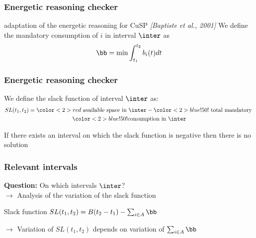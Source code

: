 \begin{frame}
  \frametitle{Energetic reasoning checker}
  {\small adaptation of the energetic reasoning for CuSP {\color{gray!50!black!50} \it [Baptiste et al., 2001]}}
  \vfill
  We define the mandatory consumption of $i$ in interval $\inter$ as 
  \[\bb=\min \int_{t_1}^{t_2} b_i(t) dt\]
  \vfill
  
\end{frame}



\begin{frame}
  \frametitle{Energetic reasoning checker}
  We define the  slack function of interval $\inter$ as:
  \begin{gather}
    SL(t_1,t_2)={\color<2>{red}\text{ available space in
      }\inter}-{\color<2>{blue!50!}\text{ total mandatory }} \nonumber\\ 
        {\color<2>{blue!50!}\text{consumption in } \inter}\nonumber
  \end{gather}
  \begin{theorem}
    If there exists an interval on which the slack function is negative then there is no solution
  \end{theorem}
  \vfill
\end{frame}

\begin{frame}
  \frametitle{Relevant intervals}
  {\bf Question: } On which intervals $\inter$?\\
  \vfill
  $\rightarrow$ Analysis of the variation of the slack function\\
  \vfill
  \begin{block}{Slack function}
    \centering $SL(t_1,t_2)=B(t_2-t_1) - \sum_{i \in A} \bb$
  \end{block}
  \vspace{0.8cm}
  $\rightarrow$ Variation of $SL(t_1,t_2)$ depends on variation of 
  $\sum_{i \in A} \bb$
  \vfill 
\end{frame}


